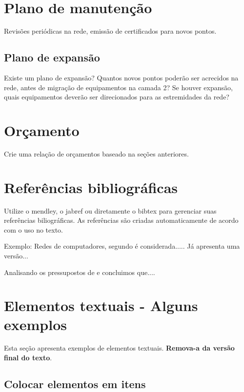 \documentclass[	DIV=calc,%
							paper=a4,%
							fontsize=12pt,%
							onecolumn]{scrartcl}	 					%
\begin{document}
\section{Plano de manutenção}

Revisões periódicas na rede, emissão de certificados para novos pontos.

\subsection{Plano de expansão}
Existe um plano de expansão? Quantos novos pontos poderão ser acrecidos na rede, antes de migração de equipamentos na camada 2? Se houver expansão, quais equipamentos deverão ser direcionados para as estremidades da rede? 


\section{Orçamento}
Crie uma relação de orçamentos baseado na seções anteriores.

\section{Referências bibliográficas}
Utilize o mendley, o jabref ou diretamente o bibtex para gerenciar suas referências biliográficas. As referências são criadas automaticamente de acordo com o uso no texto.

Exemplo: Redes de computadores, segundo \cite{t2013} é considerada..... Já \cite{kurose2010} apresenta uma versão...

Analisando os pressupostos de \cite{ref3} e \cite{ref4} concluimos que....


\renewcommand\refname{} %

  


\section{Elementos textuais - Alguns exemplos}

Esta seção apresenta exemplos de elementos textuais. \textbf{Remova-a da versão final do texto}.


\subsection{Colocar elementos em itens}
\end{document}
